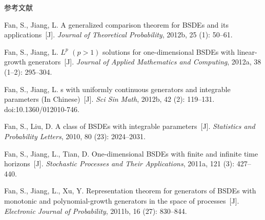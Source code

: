 \documentclass[xcolor=svgnames,serif,table,10pt]{beamer}
\begin{document}
\begin{frame}[allowframebreaks]{参考文献}
\begin{thebibliography}{57}
Fan, S., Jiang, L.
\newblock A generalized comparison theorem for {BSDE}s and its
  applications~[J].
\newblock \emph{Journal of Theoretical Probability}, 2012b,
  25 (1): 50--61.

Fan, S., Jiang, L.
\newblock ${L}^p$ $(p>1)$ solutions for one-dimensional {BSDE}s with
  linear-growth generators~[J].
\newblock \emph{Journal of Applied Mathematics and Computing}, 2012a,
  38 (1--2): 295--304.

Fan, S., Jiang, L.
s with uniformly continuous generators and integrable
  parameters ({I}n {C}hinese)~[J].
\newblock \emph{Sci Sin Math}, 2012b, 42 (2): 119--131.
\newblock doi:10.1360/012010-746.

Fan, S., Liu, D.
\newblock A class of {BSDE}s with integrable parameters~[J].
\newblock \emph{Statistics and Probability Letters}, 2010, 80
  (23): 2024--2031.

Fan, S., Jiang, L., Tian, D.
\newblock One-dimensional {BSDE}s with finite and infinite time horizons~[J].
\newblock \emph{Stochastic Processes and Their Applications},
  2011{a}, 121 (3): 427--440.

Fan, S., Jiang, L., Xu, Y.
\newblock Representation theorem for generators of {BSDE}s with monotonic and
  polynomial-growth generators in the space of processes~[J].
\newblock \emph{Electronic Journal of Probability}, 2011b,
  16 (27): 830--844.





\end{thebibliography}
\end{frame}
\end{document}
